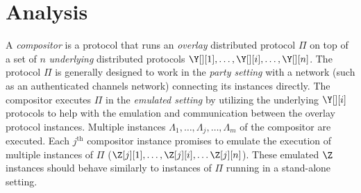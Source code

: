 \section{Analysis}

%

\begin{definition}[Lateness]
\end{definition}

\begin{definition}[Exec]
\end{definition}

\begin{definition}[View]
\end{definition}


A \emph{compositor} is a protocol that
runs an \emph{overlay} distributed protocol $\Pi$ on top of a set of
$n$ \emph{underlying} distributed protocols $\Y[][1], \ldots, \Y[][i], \ldots, \Y[][n]$.
The protocol $\Pi$ is generally designed
to work in the \emph{party setting} with a network (such as an authenticated channels network)
connecting its instances directly.
The compositor executes
$\Pi$ in the \emph{emulated setting} by utilizing the underlying
$\Y[][i]$ protocols to help with the emulation and communication between the
overlay protocol instances.
Multiple instances $\Lambda_1, \ldots, \Lambda_j, \ldots, \Lambda_m$
of the compositor are executed.
Each $j^\text{th}$ compositor instance promises to emulate the execution of multiple
instances of $\Pi$ ($\Z[j][1], \ldots, \Z[j][i], \ldots \Z[j][n]$).
These emulated $\Z$ instances should behave similarly to instances of $\Pi$
running in a stand-alone setting.

